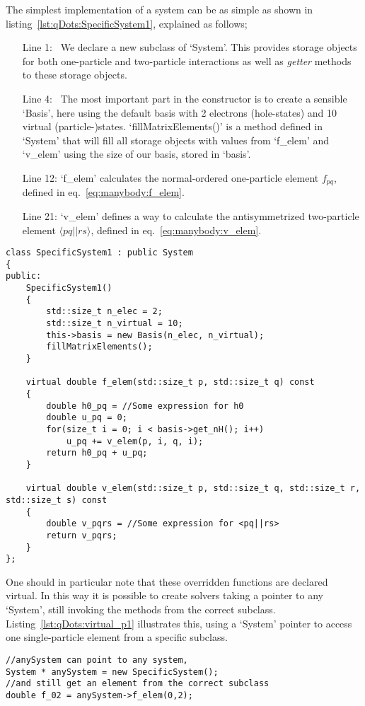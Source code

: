 The simplest implementation of a system can be as simple as shown in listing~\ref{lst:qDots:SpecificSystem1}, explained as follows;
\begin{itemize}
\item[Line 1:~] We declare a new subclass of `System'. This provides storage objects for both one-particle and two-particle interactions as well as \textit{getter} methods to these storage objects.
\item[Line 4:~] The most important part in the constructor is to create a sensible `Basis', here using the default basis with 2 electrons (hole-states) and 10 virtual (particle-)states. `fillMatrixElements()' is a method defined in `System' that will fill all storage objects with values from `f\_elem' and `v\_elem' using the size of our basis, stored in `basis'.
\item[Line 12:] `f\_elem' calculates the normal-ordered one-particle element $f_{pq}$, defined in eq.~\eqref{eq:manybody:f_elem}. 
\item[Line 21:] `v\_elem' defines a way to calculate the antisymmetrized two-particle element $\langle pq || rs \rangle $, defined in eq.~\eqref{eq:manybody:v_elem}.
\end{itemize}
\begin{lstlisting}[float,label={lst:qDots:SpecificSystem1},caption={Example on how to implement a specific system by extending the `System' super class.}]
class SpecificSystem1 : public System
{
public:
	SpecificSystem1()
	{
		std::size_t n_elec = 2;
		std::size_t n_virtual = 10;
		this->basis = new Basis(n_elec, n_virtual);
		fillMatrixElements();
	}
	
	virtual double f_elem(std::size_t p, std::size_t q) const
	{
		double h0_pq = //Some expression for h0
		double u_pq = 0;
		for(size_t i = 0; i < basis->get_nH(); i++)
			u_pq += v_elem(p, i, q, i);
		return h0_pq + u_pq;
	}
	
	virtual double v_elem(std::size_t p, std::size_t q, std::size_t r, std::size_t s) const
	{
		double v_pqrs = //Some expression for <pq||rs>
		return v_pqrs;
	}
};
\end{lstlisting}
One should in particular note that these overridden functions are declared virtual. In this way it is possible to create solvers taking a pointer to any `System', still invoking the methods from the correct subclass. 
Listing~\ref{lst:qDots:virtual_p1} illustrates this, using a `System' pointer to access one single-particle element from a specific subclass.
\begin{lstlisting}[float,label={lst:qDots:virtual_p1},caption={A subclass has implemented the function `f\_elem()' returning the element $f_{02}$. The `System' base class has this method declared virtual, resulting in invoking the subclass implementation even when using a super-class pointer.},name={lst:qDots:virtual}]
//anySystem can point to any system,
System * anySystem = new SpecificSystem();
//and still get an element from the correct subclass
double f_02 = anySystem->f_elem(0,2);
\end{lstlisting}

